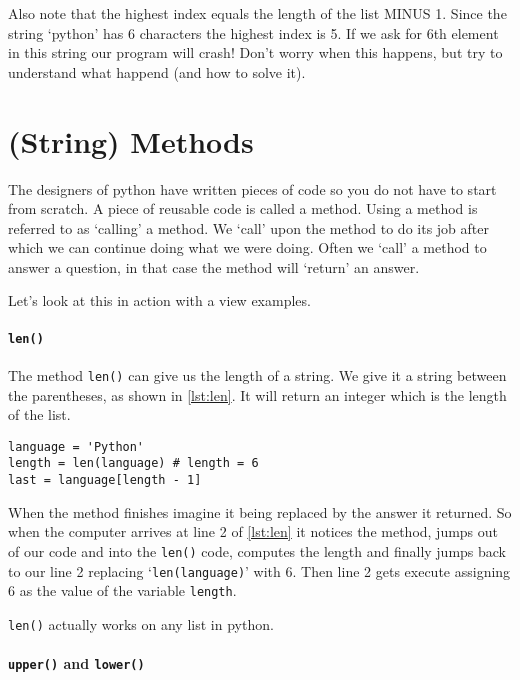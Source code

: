 	Also note that the highest index equals the length of the list MINUS 1.
	Since the string `python' has 6 characters the highest index is 5. 
	If we ask for 6th element in this string our program will crash!
	Don't worry when this happens, but try to understand what happend (and how to solve it).
	
	\section{(String) Methods}
	
	The designers of python have written pieces of code so you do not have to start from scratch. 
	A piece of reusable code is called a method.
	Using a method is referred to as `calling' a method.
	We `call' upon the method to do its job after which we can continue doing what we were doing.
	Often we `call' a method to answer a question, in that case the method will `return' an answer.
	
	Let's look at this in action with a view examples.
	
	\paragraph{\lstinline|len()|}
	
	The method \lstinline|len()| can give us the length of a string.
	We give it a string between the parentheses, as shown in \autoref{lst:len}.
	It will return an integer which is the length of the list.
	
	\begin{lstlisting}[caption={Getting the length of a string.}, label={lst:len}]
language = 'Python'
length = len(language) # length = 6
last = language[length - 1]
	\end{lstlisting}
	
	When the method finishes imagine it being replaced by the answer it returned.
	So when the computer arrives at line 2 of \autoref{lst:len} it notices the method, jumps out of our code and into the \lstinline|len()| code, computes the length and finally jumps back to our line 2 replacing `\lstinline|len(language)|' with 6.
	Then line 2 gets execute assigning 6 as the value of the variable \lstinline|length|.
	
	\lstinline|len()| actually works on any list in python.
	
	\paragraph{\lstinline|upper()| and \lstinline|lower()|}
	
